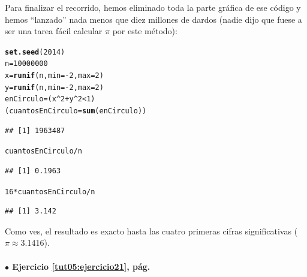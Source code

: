 \documentclass[10pt,a4paper]{article}\usepackage[]{graphicx}\usepackage[]{color}
\makeatletter
\newcommand{\hlnum}[1]{\textcolor[rgb]{0.686,0.059,0.569}{#1}}%
\newcommand{\hlopt}[1]{\textcolor[rgb]{0,0,0}{#1}}%
\newcommand{\hlstd}[1]{\textcolor[rgb]{0.345,0.345,0.345}{#1}}%
\newcommand{\hlkwb}[1]{\textcolor[rgb]{0.69,0.353,0.396}{#1}}%
\newcommand{\hlkwc}[1]{\textcolor[rgb]{0.333,0.667,0.333}{#1}}%
\newcommand{\hlkwd}[1]{\textcolor[rgb]{0.737,0.353,0.396}{\textbf{#1}}}%
\newenvironment{kframe}{%
 \def\at@end@of@kframe{}%
 \ifinner\ifhmode%
  \def\at@end@of@kframe{\end{minipage}}%
  \begin{minipage}{\columnwidth}%
 \fi\fi%
 \def\FrameCommand##1{\hskip\@totalleftmargin \hskip-\fboxsep
 \colorbox{shadecolor}{##1}\hskip-\fboxsep
     \hskip-\linewidth \hskip-\@totalleftmargin \hskip\columnwidth}%
 \MakeFramed {\advance\hsize-\width
   \@totalleftmargin\z@ \linewidth\hsize
   \@setminipage}}%
 {\par\unskip\endMakeFramed%
 \at@end@of@kframe}
\newenvironment{knitrout}{}{} %
\makeatother
\begin{document}
\begin{enumerate}
  Para finalizar el recorrido, hemos eliminado toda la parte gráfica de ese código y hemos ``lanzado'' nada menos que diez millones de dardos (nadie dijo que fuese a ser una tarea fácil calcular $\pi$ por este método):
\begin{knitrout}
\color{fgcolor}\begin{kframe}
\begin{alltt}
\hlkwd{set.seed}\hlstd{(}\hlnum{2014}\hlstd{)}
\hlstd{n} \hlkwb{=} \hlnum{10000000}
\hlstd{x} \hlkwb{=} \hlkwd{runif}\hlstd{(n,} \hlkwc{min}\hlstd{=}\hlopt{-}\hlnum{2}\hlstd{,} \hlkwc{max}\hlstd{=}\hlnum{2}\hlstd{)}
\hlstd{y} \hlkwb{=} \hlkwd{runif}\hlstd{(n,} \hlkwc{min}\hlstd{=}\hlopt{-}\hlnum{2}\hlstd{,} \hlkwc{max}\hlstd{=}\hlnum{2}\hlstd{)}
\hlstd{enCirculo} \hlkwb{=} \hlstd{(x}\hlopt{^}\hlnum{2} \hlopt{+} \hlstd{y}\hlopt{^}\hlnum{2} \hlopt{<} \hlnum{1}\hlstd{)}
\hlstd{(cuantosEnCirculo} \hlkwb{=} \hlkwd{sum}\hlstd{(enCirculo))}
\end{alltt}
\begin{verbatim}
## [1] 1963487
\end{verbatim}
\begin{alltt}
\hlstd{cuantosEnCirculo} \hlopt{/} \hlstd{n}
\end{alltt}
\begin{verbatim}
## [1] 0.1963
\end{verbatim}
\begin{alltt}
\hlnum{16} \hlopt{*} \hlstd{cuantosEnCirculo} \hlopt{/} \hlstd{n}
\end{alltt}
\begin{verbatim}
## [1] 3.142
\end{verbatim}
\end{kframe}
\end{knitrout}
  Como ves, el resultado es exacto hasta las cuatro primeras cifras significativas ($\pi\approx$3.1416).

\end{enumerate}


\paragraph{\bf $\bullet$ Ejercicio \ref{tut05:ejercicio21}, pág. \pageref{tut05:ejercicio21}}
\label{tut05:ejercicio21:sol}\quad\\
\end{document}
